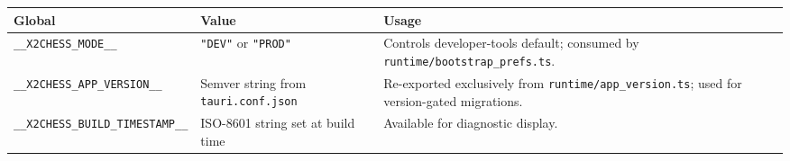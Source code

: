 \documentclass[]{article}
\begin{document}
\begin{longtable}[]{@{}lll@{}}
\toprule
\begin{minipage}[b]{0.05\columnwidth}\raggedright\strut
Global\strut
\end{minipage} & \begin{minipage}[b]{0.05\columnwidth}\raggedright\strut
Value\strut
\end{minipage} & \begin{minipage}[b]{0.05\columnwidth}\raggedright\strut
Usage\strut
\end{minipage}\tabularnewline
\midrule
\endhead
\begin{minipage}[t]{0.05\columnwidth}\raggedright\strut
\texttt{\_\_X2CHESS\_MODE\_\_}\strut
\end{minipage} & \begin{minipage}[t]{0.05\columnwidth}\raggedright\strut
\texttt{"DEV"} or \texttt{"PROD"}\strut
\end{minipage} & \begin{minipage}[t]{0.05\columnwidth}\raggedright\strut
Controls developer-tools default; consumed by
\texttt{runtime/bootstrap\_prefs.ts}.\strut
\end{minipage}\tabularnewline
\begin{minipage}[t]{0.05\columnwidth}\raggedright\strut
\texttt{\_\_X2CHESS\_APP\_VERSION\_\_}\strut
\end{minipage} & \begin{minipage}[t]{0.05\columnwidth}\raggedright\strut
Semver string from \texttt{tauri.conf.json}\strut
\end{minipage} & \begin{minipage}[t]{0.05\columnwidth}\raggedright\strut
Re-exported exclusively from \texttt{runtime/app\_version.ts}; used for
version-gated migrations.\strut
\end{minipage}\tabularnewline
\begin{minipage}[t]{0.05\columnwidth}\raggedright\strut
\texttt{\_\_X2CHESS\_BUILD\_TIMESTAMP\_\_}\strut
\end{minipage} & \begin{minipage}[t]{0.05\columnwidth}\raggedright\strut
ISO-8601 string set at build time\strut
\end{minipage} & \begin{minipage}[t]{0.05\columnwidth}\raggedright\strut
Available for diagnostic display.\strut
\end{minipage}\tabularnewline
\bottomrule
\end{longtable}
\end{document}

